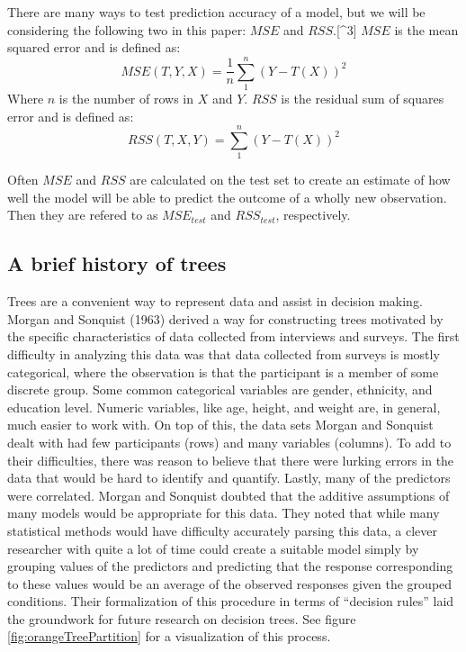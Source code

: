 \documentclass[12pt,twoside]{reedthesis}
\begin{document}
  There are many ways to test prediction accuracy of a model, but we will
  be considering the following two in this paper: \(MSE\) and
  \(RSS\).{[}\^{}3{]} \(MSE\) is the mean squared error and is defined as:
  \[MSE(T,Y,X) = \frac{1}{n} \sum_1^n (Y - T(X))^2\] Where \(n\) is the
  number of rows in \(X\) and \(Y\). \(RSS\) is the residual sum of
  squares error and is defined as: \[RSS(T,X,Y) = \sum_1^n (Y - T(X))^2\]
  
  Often \(MSE\) and \(RSS\) are calculated on the test set to create an
  estimate of how well the model will be able to predict the outcome of a
  wholly new observation. Then they are refered to as \(MSE_{test}\) and
  \(RSS_{test}\), respectively.
  
  \subsection{A brief history of trees}\label{a-brief-history-of-trees}
  
  Trees are a convenient way to represent data and assist in decision
  making. Morgan and Sonquist (1963) derived a way for constructing trees
  motivated by the specific characteristics of data collected from
  interviews and surveys. The first difficulty in analyzing this data was
  that data collected from surveys is mostly categorical, where the
  observation is that the participant is a member of some discrete group.
  Some common categorical variables are gender, ethnicity, and education
  level. Numeric variables, like age, height, and weight are, in general,
  much easier to work with. On top of this, the data sets Morgan and
  Sonquist dealt with had few participants (rows) and many variables
  (columns). To add to their difficulties, there was reason to believe
  that there were lurking errors in the data that would be hard to
  identify and quantify. Lastly, many of the predictors were correlated.
  Morgan and Sonquist doubted that the additive assumptions of many models
  would be appropriate for this data. They noted that while many
  statistical methods would have difficulty accurately parsing this data,
  a clever researcher with quite a lot of time could create a suitable
  model simply by grouping values of the predictors and predicting that
  the response corresponding to these values would be an average of the
  observed responses given the grouped conditions. Their formalization of
  this procedure in terms of ``decision rules'' laid the groundwork for
  future research on decision trees. See figure
  \ref{fig:orangeTreePartition} for a visualization of this process.
  
\end{document}
